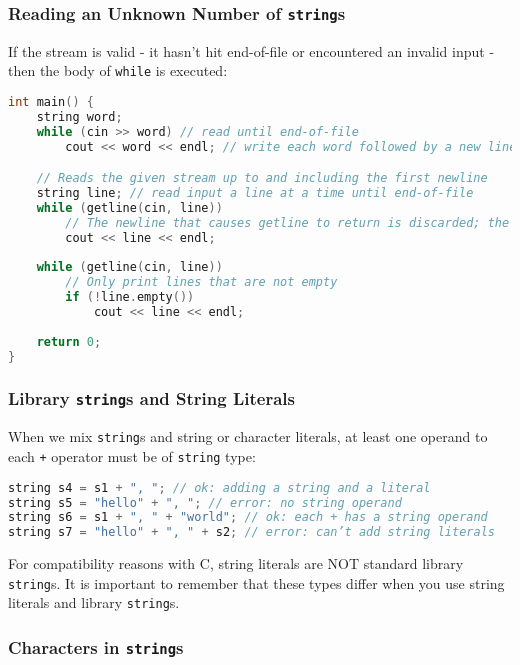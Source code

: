 \subsubsection{Reading an Unknown Number of \texttt{string}s}

If the stream is valid - it hasn't hit end-of-file or encountered an invalid input - then the body of \texttt{while} is executed:
\begin{lstlisting}[language=C++]
int main() { 
    string word; 
    while (cin >> word) // read until end-of-file 
        cout << word << endl; // write each word followed by a new line 

    // Reads the given stream up to and including the first newline
    string line; // read input a line at a time until end-of-file 
    while (getline(cin, line)) 
        // The newline that causes getline to return is discarded; the newline is not stored in the string.
        cout << line << endl; 
    
    while (getline(cin, line)) 
        // Only print lines that are not empty
        if (!line.empty()) 
            cout << line << endl;
    
    return 0; 
}
\end{lstlisting}

\subsubsection{Library \texttt{string}s and String Literals}

When we mix \texttt{string}s and string or character literals, at least one operand to each \texttt{+} operator must be of \texttt{string} type:
\begin{lstlisting}[language=C++]
string s4 = s1 + ", "; // ok: adding a string and a literal 
string s5 = "hello" + ", "; // error: no string operand 
string s6 = s1 + ", " + "world"; // ok: each + has a string operand 
string s7 = "hello" + ", " + s2; // error: can’t add string literals
\end{lstlisting}
For compatibility reasons with C, string literals are NOT standard library \texttt{string}s. It is important to remember that these types differ when you use string literals and library \texttt{string}s.

\subsubsection{Characters in \texttt{string}s}

